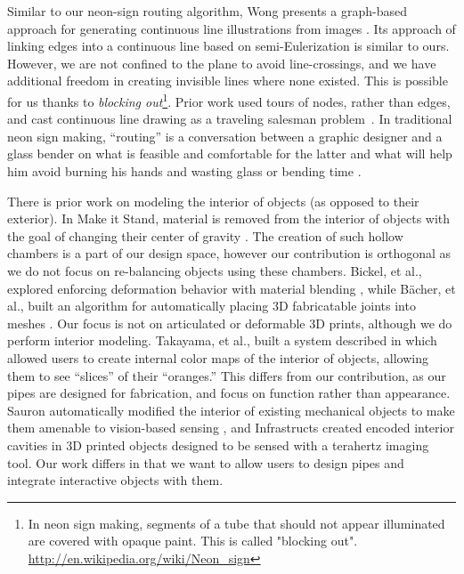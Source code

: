 Similar to our neon-sign routing algorithm, Wong presents a graph-based approach for generating continuous line illustrations from images \cite{Wong-continuousline}. Its approach of linking edges into a continuous line based on semi-Eulerization is similar to ours.  However, we are not confined to the plane to avoid line-crossings, and we have additional freedom in creating invisible lines where none existed.  This is possible for us thanks to \emph{blocking out}\footnote{In neon sign making, segments of a tube that should not appear illuminated are covered with opaque paint. This is called "blocking out". \url{http://en.wikipedia.org/wiki/Neon_sign}}. Prior work used tours of nodes, rather than edges, and cast continuous line drawing as a traveling salesman problem~\cite{Bosch-tsp}. In traditional neon sign making, ``routing'' is a conversation between a graphic designer and a glass bender on what is feasible and comfortable for the latter and what will help him avoid burning his hands and wasting glass or bending time \cite{strattman1997neon}.

There is prior work on modeling the interior of objects (as opposed to their exterior).  In Make it Stand, material is removed from the interior of objects with the goal of changing their center of gravity \cite{Prevost-makeitstand}.  The creation of such hollow chambers is a part of our design space, however our contribution is orthogonal as we do not focus on re-balancing objects using these chambers.  Bickel, et al., explored enforcing deformation behavior with material blending \cite{Bickel-deformation}, while B\"{a}cher, et al., built an algorithm for automatically placing 3D fabricatable joints into meshes \cite{Bacher-articulated}.  Our focus is not on articulated or deformable 3D prints, although we do perform interior modeling.  Takayama, et al., built a system described in \cite{Takayama-fruit} which allowed users to create internal color maps of the interior of objects, allowing them to see ``slices'' of their ``oranges.''  This differs from our contribution, as our pipes are designed for fabrication, and focus on function rather than appearance.  Sauron automatically modified the interior of existing mechanical objects to make them amenable to vision-based sensing \cite{Savage-sauron}, and Infrastructs created encoded interior cavities in 3D printed objects designed to be sensed with a terahertz imaging tool.  Our work differs in that we want to allow users to design pipes and integrate interactive objects with them. 